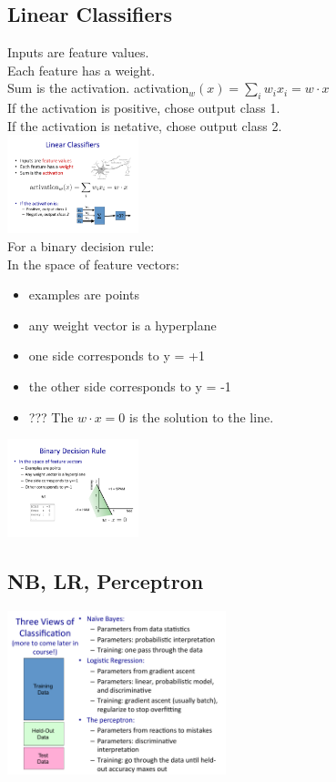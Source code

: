  
 \subsection{Linear Classifiers}
 Inputs are feature values.  \hfill \\
 Each feature has a weight.  \hfill \\
 Sum is the activation.  activation$_w(x) = \sum_i w_i x_i = w \cdot x$  \hfill \\
 If the activation is positive, chose output class 1.  \hfill \\
 If the activation is netative, chose output class 2.  \hfill \\
 
 \includegraphics[width=1.5in]{figures/linear_classifier_cartoon.pdf}  \hfill \\
 
 For a binary decision rule:   \hfill \\
 In the space of feature vectors: 
 \begin{itemize}
 	\item examples are points
	\item any weight vector is a hyperplane
	\item one side corresponds to y = +1
	\item the other side corresponds to y = -1
	\item ??? The $w \cdot x = 0$ is the solution to the line.
 \end{itemize}
 
 \includegraphics[width=1.5in]{figures/binary_decision_rule.pdf}
 
 \subsection{NB, LR, Perceptron}
\includegraphics[width=2.5in]{figures/three_views_of_classification.pdf}
 

		

